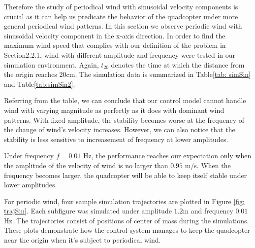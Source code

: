 Therefore the study of periodical wind with sinusoidal velocity components is crucial as it can help us predicate the behavior of the quadcopter under more general periodical wind patterns.
In this section we observe periodic wind with sinusoidal velocity component in the x-axis direction.
In order to find the maximum wind speed that complies with our definition of the problem in Section2.2.1, wind with different amplitude and frequency were tested in our simulation environment. Again, $t_20$ denotes the time at which the distance from the origin reaches 20cm. The simulation data is summarized in Table\ref{tab: simSin} and Table\ref{tab:simSin2}.

Referring from the table, we can conclude that our control model cannot handle wind with varying magnitude as perfectly as it does with dominant wind patterns. With fixed amplitude, the stability becomes worse at the frequency of the change of wind's velocity increases. However, we can also notice that the stability is less sensitive to increasement of frequency at lower amplitudes.

Under frequency $f = 0.01$ Hz, the performance reaches our expectation only when the amplitude of the velocity of wind is no larger than $0.95$ m/s. When the frequency becomes larger, the quadcopter will be able to keep itself stable under lower amplitudes.

For periodic wind, four sample simulation trajectories are plotted in Figure \ref{fig: trajSin}. Each subfigure was simulated under amplitude $1.2$m and frequency $0.01$ Hz. The trajectories consist of positions of center of mass during the simulations. These plots demonstrate how the control system manages to keep the quadcopter near the origin when it's subject to periodical wind.



